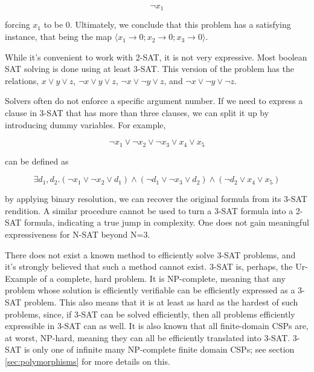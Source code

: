 \begin{equation}\label{equation:two-sat-example-pt3}
\neg x_1
\end{equation}

forcing $x_1$ to be $0$. Ultimately, we conclude that this problem has a satisfying instance, that being the map $\langle x_1 \rightarrow 0; x_2 \rightarrow 0; x_3 \rightarrow 0\rangle$.

While it's convenient to work with 2-SAT, it is not very expressive. Most boolean SAT solving is done using at least 3-SAT. This version of the problem has the relations, $x \vee y \vee z$, $\neg x \vee y \vee z$, $\neg x \vee \neg y \vee z$, and $\neg x \vee \neg y \vee \neg z$.

Solvers often do not enforce a specific argument number. If we need to express a clause in 3-SAT that has more than three clauses, we can split it up by introducing dummy variables. For example,

\begin{equation}\label{equation:three-sat-split-pt1}
\neg x_1 \vee \neg x_2 \vee \neg x_3 \vee x_4 \vee x_5
\end{equation}

can be defined as

\begin{equation}\label{equation:three-sat-split-pt1}
\exists d_1, d_2. (\neg x_1 \vee \neg x_2 \vee d_1) \wedge (\neg d_1 \vee \neg x_3 \vee d_2) \wedge (\neg d_2 \vee x_4 \vee x_5)
\end{equation}

by applying binary resolution, we can recover the original formula from its 3-SAT rendition. A similar procedure cannot be used to turn a 3-SAT formula into a 2-SAT formula, indicating a true jump in complexity. One does not gain meaningful expressiveness for N-SAT beyond N=3.

There does not exist a known method to efficiently solve 3-SAT problems, and it's strongly believed that such a method cannot exist. 3-SAT is, perhaps, the Ur-Example of a complete, hard problem. It is NP-complete, meaning that any problem whose solution is efficiently verifiable can be efficiently expressed as a 3-SAT problem. This also means that it is at least as hard as the hardest of such problems, since, if 3-SAT can be solved efficiently, then all problems efficiently expressible in 3-SAT can as well. It is also known that all finite-domain CSPs are, at worst, NP-hard, meaning they can all be efficiently translated into 3-SAT. 3-SAT is only one of infinite many NP-complete finite domain CSPs; see section \ref{sec:polymorphisms} for more details on this.

